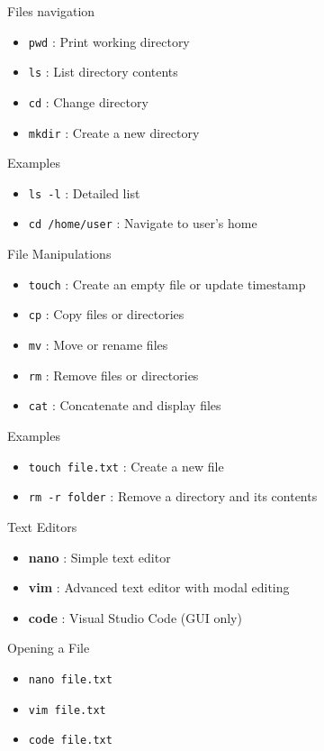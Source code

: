 \documentclass{beamer}
\begin{document}
\begin{frame}{Files navigation}
  \begin{itemize}
    \item \texttt{pwd} : Print working directory
    \item \texttt{ls} : List directory contents
    \item \texttt{cd} : Change directory
    \item \texttt{mkdir} : Create a new directory
  \end{itemize}
  \begin{exampleblock}{Examples}
    \begin{itemize}
      \item \texttt{ls -l} : Detailed list
      \item \texttt{cd /home/user} : Navigate to user's home
    \end{itemize}
  \end{exampleblock}
\end{frame}

\begin{frame}{File Manipulations}
  \begin{itemize}
    \item \texttt{touch} : Create an empty file or update timestamp
    \item \texttt{cp} : Copy files or directories
    \item \texttt{mv} : Move or rename files
    \item \texttt{rm} : Remove files or directories
    \item \texttt{cat} : Concatenate and display files
  \end{itemize}
  \begin{exampleblock}{Examples}
    \begin{itemize}
      \item \texttt{touch file.txt} : Create a new file
      \item \texttt{rm -r folder} : Remove a directory and its contents
    \end{itemize}
  \end{exampleblock}
\end{frame}

\begin{frame}{Text Editors}
  \begin{itemize}
    \item \textbf{nano} : Simple text editor
    \item \textbf{vim} : Advanced text editor with modal editing
    \item \textbf{code} : Visual Studio Code (GUI only)
  \end{itemize}
  \begin{exampleblock}{Opening a File}
    \begin{itemize}
      \item \texttt{nano file.txt}
      \item \texttt{vim file.txt}
      \item \texttt{code file.txt}
    \end{itemize}
  \end{exampleblock}
\end{frame}
\end{document}
